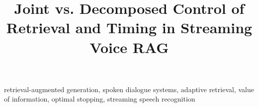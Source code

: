 \documentclass[conference]{IEEEtran}
\begin{document}
\title{Joint vs. Decomposed Control of Retrieval and Timing in Streaming Voice RAG}

\author{
}

\maketitle

\begin{abstract}

\end{abstract}

\begin{IEEEkeywords}
retrieval-augmented generation, spoken dialogue systems, adaptive retrieval,
value of information, optimal stopping, streaming speech recognition
\end{IEEEkeywords}













\end{document}
